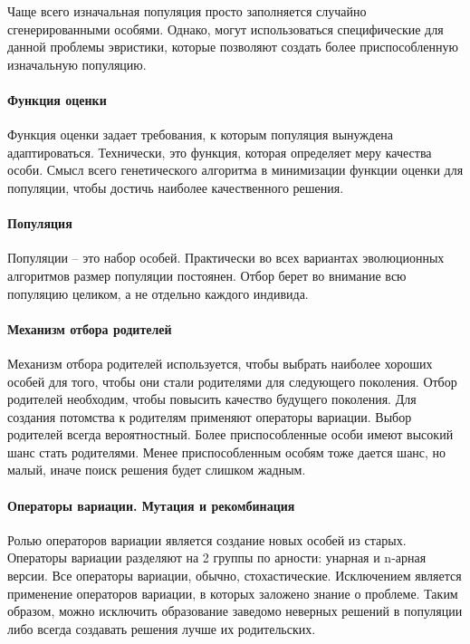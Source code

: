 \documentclass{fefu_thesis/cls/fefu}
\begin{document}
    Чаще всего изначальная популяция просто заполняется случайно сгенерированными особями. Однако, могут использоваться специфические для данной проблемы эвристики, которые позволяют создать более приспособленную изначальную популяцию.

    \paragraph{Функция оценки}

    Функция оценки задает требования, к которым популяция вынуждена адаптироваться. Технически, это функция, которая определяет меру качества особи. Смысл всего генетического алгоритма в минимизации функции оценки для популяции, чтобы достичь наиболее качественного решения.

    \paragraph{Популяция}

    Популяции -- это набор особей. Практически во всех вариантах эволюционных алгоритмов размер популяции постоянен. Отбор берет во внимание всю популяцию целиком, а не отдельно каждого индивида.

    \paragraph{Механизм отбора родителей}

    Механизм отбора родителей используется, чтобы выбрать наиболее хороших особей для того, чтобы они стали родителями для следующего поколения. Отбор родителей необходим, чтобы повысить качество будущего поколения. Для создания потомства к родителям применяют операторы вариации. Выбор родителей всегда вероятностный. Более приспособленные особи имеют высокий шанс стать родителями. Менее приспособленным особям тоже дается шанс, но малый, иначе поиск решения будет слишком жадным.

    \paragraph{Операторы вариации. Мутация и рекомбинация}

    Ролью операторов вариации является создание новых особей из старых. Операторы вариации разделяют на 2 группы по арности: унарная и n-арная версии. Все операторы вариации, обычно, стохастические. Исключением является применение операторов вариации, в которых заложено знание о проблеме. Таким образом, можно исключить образование заведомо неверных решений в популяции либо всегда создавать решения лучше их родительских.
\end{document}
